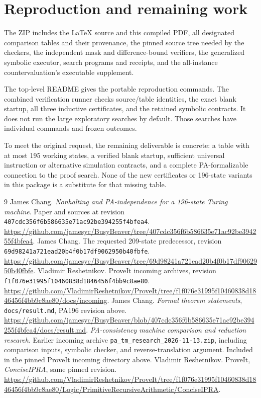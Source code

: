 \documentclass[11pt,letterpaper]{article}
\newcommand{\file}[1]{\texttt{\nolinkurl{#1}}}
\begin{document}
\section{Reproduction and remaining work}

The ZIP includes the LaTeX source and this compiled PDF, all designated
comparison tables and their provenance, the pinned source tree needed
by the checkers, the independent mask and difference-bound verifiers,
the generalized symbolic executor, search programs and receipts, and
the all-instance countervaluation's executable supplement.

The top-level README gives the portable reproduction commands. The
combined verification runner checks source/table identities, the exact
blank startup, all three inductive certificates, and the retained symbolic
contracts. It does not run the large exploratory searches by default.
Those searches have individual commands and frozen outcomes.

To meet the original request, the remaining deliverable is concrete:
a table with at most 195 working states, a verified blank startup,
sufficient universal instruction or alternative simulation contracts,
and a complete PA-formalizable connection to the proof search. None of
the new certificates or 196-state variants in this package is a
substitute for that missing table.

\begin{thebibliography}{9}
 James Chang. \emph{Nonhalting and PA-independence for a
196-state Turing machine}. Paper and sources at revision
\file{407cdc356f6b586635e71ac92be394255f4bfea4}.
\url{https://github.com/jamesyc/BusyBeaver/tree/407cdc356f6b586635e71ac92be394255f4bfea4}.
 James Chang. The requested 209-state predecessor,
revision \file{69d98241a721ead20b4f0b17df9062950b40fbfe}.
\url{https://github.com/jamesyc/BusyBeaver/tree/69d98241a721ead20b4f0b17df9062950b40fbfe}.
 Vladimir Reshetnikov. ProveIt incoming archives,
revision \file{f1f076e31995f10460838d1846456f4bb9c8ae80}.
\url{https://github.com/VladimirReshetnikov/ProveIt/tree/f1f076e31995f10460838d1846456f4bb9c8ae80/docs/incoming}.
 James Chang. \emph{Formal theorem statements},
\file{docs/result.md}, PA196 revision above.
\url{https://github.com/jamesyc/BusyBeaver/blob/407cdc356f6b586635e71ac92be394255f4bfea4/docs/result.md}.
 \emph{PA-consistency machine comparison and reduction
research}. Earlier incoming archive \file{pa_tm_research_2026-11-13.zip},
including comparison inputs, symbolic checker, and reverse-translation
argument. Included in the pinned ProveIt incoming directory above.
 Vladimir Reshetnikov. ProveIt, \emph{ConciseIPRA},
same pinned revision.
\url{https://github.com/VladimirReshetnikov/ProveIt/tree/f1f076e31995f10460838d1846456f4bb9c8ae80/Logic/PrimitiveRecursiveArithmetic/ConciseIPRA}.
\end{thebibliography}
\end{document}

